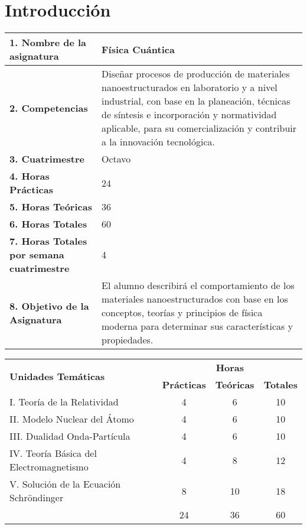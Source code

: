 \chapter{Introducción}
	\begin{tabular}{|p{6cm}|p{9cm}|}
	\hline 
	\textbf{1. Nombre de la asignatura }& Física Cuántica \\
	\hline 
	\textbf{2. Competencias }& Diseñar procesos de producción de materiales nanoestructurados en laboratorio y a nivel industrial, con base en la planeación, técnicas de síntesis e incorporación y normatividad aplicable, para su comercialización y contribuir a la innovación tecnológica.
	
 \\
       \hline 
       \textbf{3. Cuatrimestre} & Octavo \\
       \hline 
       \textbf{4. Horas Prácticas} & 24 \\
       \hline
        \textbf{5. Horas Teóricas} & 36 \\
        \hline
       \textbf{6. Horas Totales} & 60 \\
        \hline
        \textbf{7. Horas Totales por semana cuatrimestre} & 4 \\
        \hline
        \textbf{8. Objetivo de la Asignatura} & El alumno describirá el comportamiento de los materiales
        nanoestructurados con base en los conceptos, teorías y principios de física moderna para determinar sus
        características y propiedades. \\
        \hline
	\end{tabular}
	
\begin{tabular}{|p{9.5cm}|c|c|c|}
\hline
\multirow{2}{*}{\textbf{Unidades Temáticas}} & \multicolumn{3}{c}{\textbf{Horas}} \\


  & \textbf{Prácticas} & \textbf{Teóricas} & \textbf{Totales} \\
  \hline
I. Teoría de la Relatividad
 & 4 & 6 & 10\\
\hline
II. Modelo Nuclear del Átomo & 4 & 6 & 10\\
\hline
III. Dualidad Onda-Partícula & 4 & 6 & 10 \\
\hline
IV. Teoría Básica del Electromagnetismo & 4 & 8 & 12 \\
\hline
V. Solución de la Ecuación Schröndinger & 8 & 10 & 18 \\
\hline
 & 24 & 36 & 60 \\
\hline


\end{tabular}